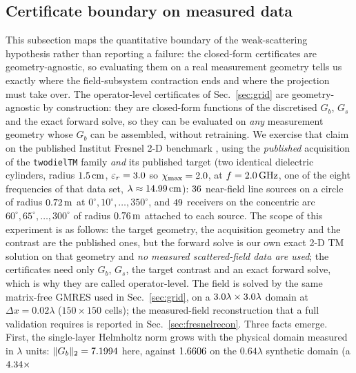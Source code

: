 \documentclass[journal,cmes,article,submit,moreauthors,pdftex]{Definitions/tsp}
\newcommand{\norm}[1]{\lVert #1 \rVert}
\newcommand{\numv}[1]{#1}
\begin{document}
\subsection{Certificate boundary on measured data}
\label{sec:fresnel}
This subsection maps the quantitative boundary of the weak-scattering hypothesis rather than reporting a failure: the closed-form certificates are geometry-agnostic, so evaluating them on a real measurement geometry tells us exactly where the field-subsystem contraction ends and where the projection must take over. The operator-level certificates of Sec.~\ref{sec:grid} are geometry-agnostic by
construction: they are closed-form functions of the discretised $G_b$, $G_s$ and the
exact forward solve, so they can be evaluated on \emph{any} measurement geometry whose
$G_b$ can be assembled, without retraining. We exercise that claim on the published
Institut Fresnel 2-D benchmark \cite{fresnel_db}, using the \emph{published} acquisition
of the \texttt{twodielTM} family \emph{and} its published target (two identical dielectric
cylinders, radius $\numv{\NumFresnelRadiusCm}\,\mathrm{cm}$,
$\varepsilon_r=\numv{\NumFresnelEpsR}$ so $\chi_{\max}=\numv{\NumFresnelChiMax}$, at
$f=\numv{\NumFresnelFreq}\,\mathrm{GHz}$, one of the eight frequencies of that data set,
$\lambda\approx\numv{\NumFresnelLamCm}\,\mathrm{cm}$): $\numv{\NumFresnelPubNinc}$
near-field line sources on a circle of radius
$\numv{\NumFresnelPubRsM}\,\mathrm{m}$ at $0^\circ,10^\circ,\dots,350^\circ$, and
$\numv{\NumFresnelPubNrx}$ receivers on the concentric arc
$60^\circ,65^\circ,\dots,300^\circ$ of radius $\numv{\NumFresnelPubRrM}\,\mathrm{m}$
attached to each source. The scope of this experiment is as follows:
the target geometry, the acquisition geometry and the contrast are the published ones, but
the forward solve is our own exact 2-D TM solution on that geometry and \emph{no measured
scattered-field data are used}; the certificates need only $G_b$, $G_s$, the target
contrast and an exact forward solve, which is why they are called operator-level.
The field is solved by the same
matrix-free GMRES used in Sec.~\ref{sec:grid}, on a
$\numv{\NumFresnelDomainLam}\lambda\times\numv{\NumFresnelDomainLam}\lambda$ domain at
$\Delta x=0.02\lambda$ ($150\times150$ cells); the measured-field reconstruction that a full
validation requires is reported in Sec.~\ref{sec:fresnelrecon}. Three
facts emerge.
First, the single-layer Helmholtz norm grows with the physical domain measured in
$\lambda$ units: $\norm{G_b}_2=\numv{\NumFresnelGb}$ here, against
$\numv{\NumGridGbLo}$ on the $0.64\lambda$ synthetic domain (a $\numv{\NumFresnelGbRatio}\times$
\end{document}
